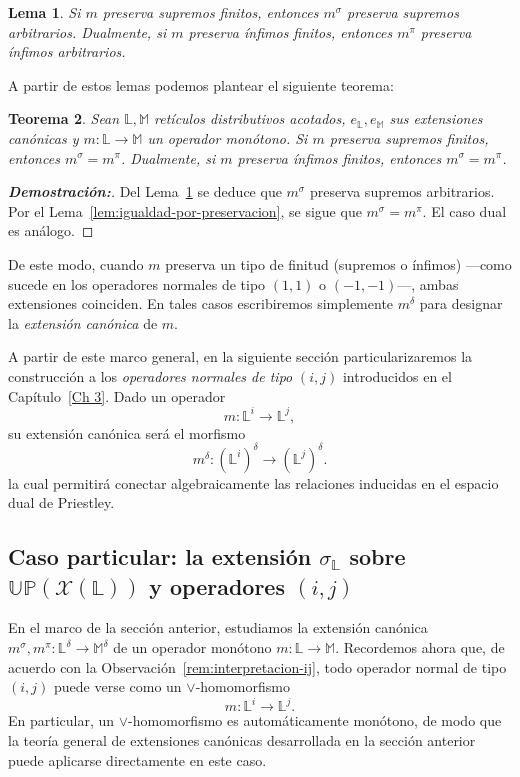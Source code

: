 \documentclass[12pt]{book}
\newtheorem{theorem}{Teorema}[section]
\newtheorem{lemma}[theorem]{Lema}
\newcommand{\Up}{\mathbb{UP}}
\begin{document}
\begin{lemma}\label{lem:preserva-supremos}\cite[Lema~4.2]{GehrkeHarding2001}
Si $m$ preserva supremos finitos, entonces $m^{\sigma}$ preserva supremos arbitrarios.
Dualmente, si $m$ preserva ínfimos finitos, entonces $m^{\pi}$ preserva ínfimos arbitrarios.
\end{lemma}

A partir de estos lemas podemos plantear el siguiente teorema:

\begin{theorem}\label{thm:suavidad-generalizada}
Sean $\mathbb{L},\mathbb{M}$ retículos distributivos acotados, 
$e_\mathbb{L},e_\mathbb{M}$ sus extensiones canónicas y 
$m\colon\mathbb{L}\to\mathbb{M}$ un operador monótono.
Si $m$ preserva supremos finitos, entonces $m^{\sigma}=m^{\pi}$.
Dualmente, si $m$ preserva ínfimos finitos, entonces $m^{\sigma}=m^{\pi}$.
\end{theorem}

\begin{proof}[\textbf{Demostración:}]
Del Lema~\ref{lem:preserva-supremos} se deduce que $m^{\sigma}$ preserva supremos arbitrarios.
Por el Lema~\ref{lem:igualdad-por-preservacion}, se sigue que $m^{\sigma}=m^{\pi}$.
El caso dual es análogo.
\end{proof}

De este modo, cuando $m$ preserva un tipo de finitud (supremos o ínfimos) —como sucede en los operadores normales de tipo $(1,1)$ o $(-1,-1)$—,
ambas extensiones coinciden. En tales casos escribiremos simplemente $m^{\delta}$ para designar la \emph{extensión canónica} de $m$.

A partir de este marco general, en la siguiente sección particularizaremos la construcción 
a los \emph{operadores normales de tipo} $(i,j)$ introducidos en el Capítulo~\ref{Ch 3}. 
Dado un operador
\[
m:\mathbb{L}^i \longrightarrow \mathbb{L}^j,
\]
su extensión canónica será el morfismo
\[
m^{\delta}:(\mathbb{L}^i)^\delta \longrightarrow (\mathbb{L}^j)^\delta.
\]
la cual permitirá conectar algebraicamente las relaciones inducidas en el espacio dual de Priestley.


\subsection{Caso particular: la extensión \(\sigma_{\mathbb{L}}\) sobre 
\(\Up(\mathcal{X}(\mathbb L))\) y operadores \((i,j)\)}\label{extension-operadores-sigma}

En el marco de la sección anterior, estudiamos la extensión canónica
$m^\sigma,m^\pi\colon \mathbb L^\delta\to\mathbb M^\delta$ de un
operador monótono $m\colon\mathbb L\to\mathbb M$.
Recordemos ahora que, de acuerdo con la Observación~\ref{rem:interpretacion-ij},
todo operador normal de tipo $(i,j)$ puede verse como un 
\(\vee\)-homomorfismo
\[
  m\colon \mathbb{L}^i \longrightarrow \mathbb{L}^j.
\]
En particular, un \(\vee\)-homomorfismo es automáticamente monótono, de modo que
la teoría general de extensiones canónicas desarrollada en la sección anterior
puede aplicarse directamente en este caso.
\end{document}
